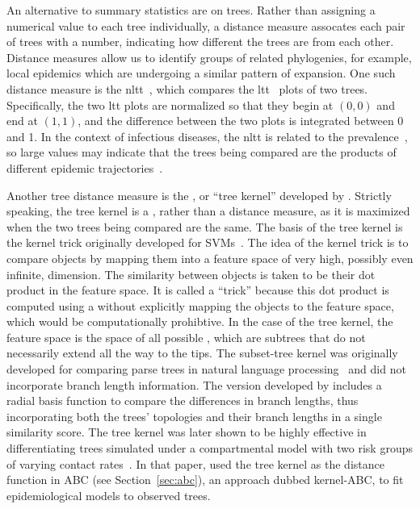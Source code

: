 An alternative to summary statistics are  on trees.
Rather than assigning a numerical value to each tree individually, a distance
measure assocates each pair of trees with a number, indicating how different
the trees are from each other. Distance measures allow us to identify groups of
related phylogenies, for example, local epidemics which are undergoing a
similar pattern of expansion. One such distance measure is the
\gls{nltt}~\autocite{janzen2015approximate}, which compares the
\gls{ltt}~\autocite{nee1992tempo} plots of two trees. Specifically, the two
\gls{ltt} plots are normalized so that they begin at $(0, 0)$ and end at $(1,
1)$, and the difference between the two plots is integrated between 0 and 1.
In the context of infectious diseases, the \gls{nltt} is related to the
prevalence~\autocite{holmes1995revealing}, so large values may indicate that
the trees being compared are the products of different epidemic
trajectories~\autocite{janzen2015approximate}.

Another tree distance measure is the , or ``tree
kernel'' developed by \textcite{poon2013mapping}. Strictly speaking, the tree
kernel is a , rather than a distance measure, as it is
maximized when the two trees being compared are the same. The basis of the tree
kernel is the kernel trick originally developed for
\glspl{SVM}~\autocite{burges1998tutorial}. The idea of the kernel trick is to
compare objects by mapping them into a feature space of very high, possibly
even infinite, dimension. The similarity between objects is taken to be their
dot product in the feature space. It is called a ``trick'' because this dot
product is computed using a  without explicitly mapping
the objects to the feature space, which would be computationally prohibtive. In
the case of the tree kernel, the feature space is the space of all possible
, which are subtrees that do not necessarily extend all the
way to the tips. The subset-tree kernel was originally developed for comparing
parse trees in natural language processing~\autocite{collins2002new} and did
not incorporate branch length information. The version developed by
\textcite{poon2013mapping} includes a radial basis function to compare the
differences in branch lengths, thus incorporating both the trees' topologies
and their branch lengths in a single similarity score. The tree kernel was
later shown to be highly effective in differentiating trees simulated under a
compartmental model with two risk groups of varying contact
rates~\autocite{poon2015phylodynamic}. In that paper,
\citeauthor{poon2015phylodynamic} used the tree kernel as the distance function
in \gls{ABC} (see Section~\ref{sec:abc}), an approach dubbed kernel-\gls{ABC},
to fit epidemiological models to observed trees.

